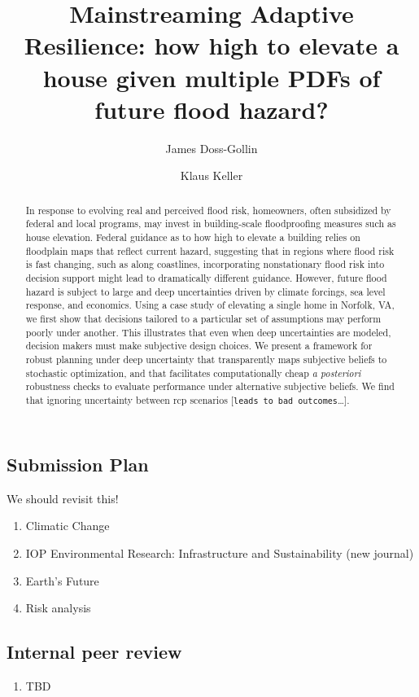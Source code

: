 \documentclass[12pt]{article}
\title{Mainstreaming Adaptive Resilience: how high to elevate a house given multiple PDFs of future flood hazard?}
\author[1]{James Doss-Gollin}
\author[2,3]{Klaus Keller}
\affil[1]{Department of Civil and Environmental Engineering, Rice University}
\affil[2]{Department of Geosciences, the Pennsylvania State University}
\affil[3]{Earth and Environmental Systems Institute, the Pennsylvania State University}
\begin{document}
\maketitle
\thispagestyle{empty}

\begin{abstract}
    In response to evolving real and perceived flood risk, homeowners, often subsidized by federal and local programs, may invest in building-scale floodproofing measures such as house elevation.
    Federal guidance as to how high to elevate a building relies on floodplain maps that reflect current hazard, suggesting that in regions where flood risk is fast changing, such as along coastlines, incorporating nonstationary flood risk into decision support might lead to dramatically different guidance.
    However, future flood hazard is subject to large and deep uncertainties driven by climate forcings, sea level response, and economics.
    Using a case study of elevating a single home in Norfolk, VA, we first show that decisions tailored to a particular set of assumptions may perform poorly under another.
    This illustrates that even when deep uncertainties are modeled, decision makers must make subjective design choices.
    We present a framework for robust planning under deep uncertainty that transparently maps subjective beliefs to stochastic optimization, and that facilitates computationally cheap \emph{a posteriori} robustness checks to evaluate performance under alternative subjective beliefs.
    We find that ignoring uncertainty between \gls{rcp} scenarios [\texttt{leads to bad outcomes}\ldots].
\end{abstract}
\subsection*{Submission Plan}
We should revisit this!
\begin{enumerate}
    \item Climatic Change
    \item IOP Environmental Research: Infrastructure and Sustainability (new journal)
    \item Earth's Future
    \item Risk analysis
\end{enumerate}
\subsection*{Internal peer review}
\begin{enumerate}
    \item TBD
\end{enumerate}
\end{document}
